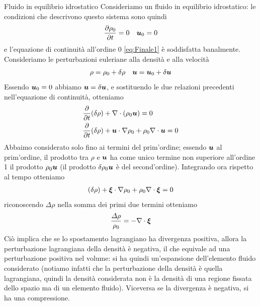 \begin{Example}{Fluido in equilibrio idrostatico}
Consideriamo un fluido in equilibrio idrostatico: le condizioni che descrivono questo sistema sono quindi
\begin{align*}
&\derP{\rho_0}{t} = 0
& \V{u}_0 =0
\end{align*}
e l'equazione di continuità all'ordine 0 \ref{eq:Finale1} è soddisfatta banalmente. Consideriamo le perturbazioni euleriane alla densità e alla velocità
\begin{align*}
& \rho = \rho_0 + \delta \rho
& \V{u} = \V{u}_0 + \delta\V{u}
\end{align*}
Essendo $\V{u}_0=0$ abbiamo $ \V{u} =  \delta\V{u}$, e sostituendo le due relazioni precedenti nell'equazione di continuità, otteniamo
\begin{align*}
&\derP{}{t}(\delta\rho) + \V{\nabla} \cdot(\rho_0\V{u}) = 0 \\
&\derP{}{t}(\delta\rho) + \scal{u}{\nabla}\rho_0  + \rho_0 \scal{\nabla}{u} = 0
\end{align*}
Abbaimo considerato solo fino ai termini del prim'ordine; essendo $\V{u}$ al prim'ordine, il prodotto tra $\rho$ e $\V{u}$ ha come unico termine non superiore all'ordine 1 il prodotto $\rho_0\V{u}$ (il prodotto $\delta\rho_0\V{u}$ è del second'ordine). Integrando ora rispetto al tempo otteniamo
\begin{align*}
(\delta\rho) + \scal{\xi}{\nabla}\rho_0  + \rho_0 \scal{\nabla}{\xi} = 0
\end{align*}
riconoscendo $\Delta \rho$ nella somma dei primi due termini otteniamo
\begin{equation}
\frac{\Delta\rho}{\rho_0} = -\scal{\nabla}{\xi}
\end{equation}
Ciò implica che se lo spostamento lagrangiano ha divergenza positiva, allora la perturbazione lagrangiana della densità è negativa, il che equivale ad una perturbazione positiva nel volume: si ha quindi un'espansione dell'elemento fluido considerato (notiamo infatti che la perturbazione della densità è quella lagrangiana, quindi la densità considerata non è la densità di una regione fissata dello spazio ma di un elemento fluido). Viceversa se la divergenza è negativa, si ha una compressione.
\end{Example}

